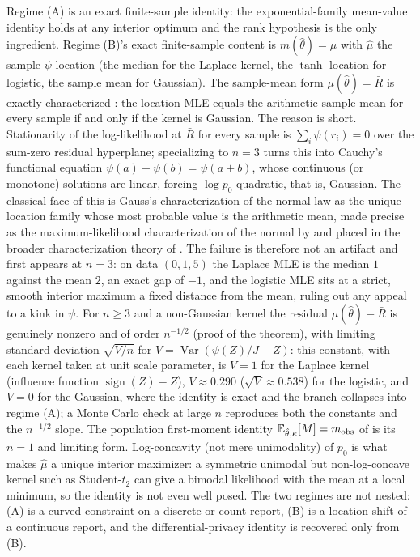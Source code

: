 \begin{remark}
\label{rem:loc-sketch}
Regime (A) is an exact finite-sample identity: the exponential-family
mean-value identity holds at any interior optimum and the rank
hypothesis is the only ingredient. Regime (B)'s exact finite-sample
content is $m(\hat\theta) = \hat\mu$ with $\hat\mu$ the sample
$\psi$-location (the median for the Laplace kernel, the
$\tanh$-location for logistic, the sample mean for Gaussian). The
sample-mean form $\mu(\hat\theta) = \bar R$ is exactly characterized
\citep{teicher1961maximum}: the location MLE equals the arithmetic
sample mean for every sample if and only if the kernel is Gaussian. The
reason is short. Stationarity
of the log-likelihood at $\bar R$ for every sample is $\sum_i \psi(r_i)
= 0$ over the sum-zero residual hyperplane; specializing to $n = 3$
turns this into Cauchy's functional equation $\psi(a) + \psi(b) =
\psi(a + b)$, whose continuous (or monotone) solutions are linear,
forcing $\log p_0$ quadratic, that is, Gaussian. The classical face of
this is Gauss's characterization of the normal law as the unique
location family whose most probable value is the arithmetic mean, made
precise as the maximum-likelihood characterization of the normal by
\citet{teicher1961maximum} and placed in the broader characterization
theory of \citet{kagan1973characterization}. The
failure is therefore not an artifact and first appears at $n = 3$: on
data $(0, 1, 5)$ the Laplace MLE is the median $1$ against the mean
$2$, an exact gap of $-1$, and the logistic MLE sits at a strict,
smooth interior maximum a fixed distance from the mean, ruling out any
appeal to a kink in $\psi$. For $n \ge 3$ and a non-Gaussian kernel
the residual $\mu(\hat\theta) - \bar R$ is genuinely nonzero and of
order $n^{-1/2}$ (proof of the theorem), with limiting standard deviation
$\sqrt{V/n}$ for $V = \operatorname{Var}(\psi(Z)/J - Z)$: this constant, with
each kernel taken at unit scale parameter, is
$V = 1$ for the Laplace kernel (influence function $\operatorname{sign}(Z) - Z$),
$V \approx 0.290$ ($\sqrt{V} \approx 0.538$) for the logistic, and $V = 0$ for the
Gaussian, where the identity is exact and the branch collapses into regime (A); a
Monte Carlo check at large $n$ reproduces both the constants and the $n^{-1/2}$
slope. The population first-moment
identity $\mathbb{E}_{\hat\theta,\kappa}[M] = m_{\mathrm{obs}}$ of
\citet{towell2026dpcoarsening} is its $n = 1$ and limiting form.
Log-concavity (not mere unimodality) of $p_0$ is what makes $\hat\mu$ a
unique interior maximizer: a symmetric unimodal but non-log-concave
kernel such as Student-$t_2$ can give a bimodal likelihood with the
mean at a local minimum, so the identity is not even well posed. The
two regimes are not nested: (A) is a curved constraint on a discrete or
count report, (B) is a location shift of a continuous report, and the
differential-privacy identity is recovered only from (B).
\end{remark}

